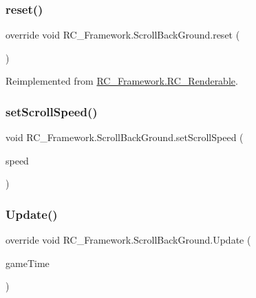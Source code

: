\subsubsection{\texorpdfstring{reset()}{reset()}}
{\footnotesize\ttfamily override void R\+C\+\_\+\+Framework.\+Scroll\+Back\+Ground.\+reset (\begin{DoxyParamCaption}{ }\end{DoxyParamCaption})\hspace{0.3cm}{\ttfamily [virtual]}}



Reimplemented from \mbox{\hyperlink{class_r_c___framework_1_1_r_c___renderable_ae65ce69704d15963789f421b58618b1f}{R\+C\+\_\+\+Framework.\+R\+C\+\_\+\+Renderable}}.

\mbox{\label{class_r_c___framework_1_1_scroll_back_ground_a51b38c4f29b384ab4421e420b3fd7201}} 
\subsubsection{\texorpdfstring{set\+Scroll\+Speed()}{setScrollSpeed()}}
{\footnotesize\ttfamily void R\+C\+\_\+\+Framework.\+Scroll\+Back\+Ground.\+set\+Scroll\+Speed (\begin{DoxyParamCaption}\item[{float}]{speed }\end{DoxyParamCaption})}

\mbox{\label{class_r_c___framework_1_1_scroll_back_ground_ac999fc666d1abebe93d7d659e5a53e8a}} 
\subsubsection{\texorpdfstring{Update()}{Update()}}
{\footnotesize\ttfamily override void R\+C\+\_\+\+Framework.\+Scroll\+Back\+Ground.\+Update (\begin{DoxyParamCaption}\item[{Game\+Time}]{game\+Time }\end{DoxyParamCaption})\hspace{0.3cm}{\ttfamily [virtual]}}



